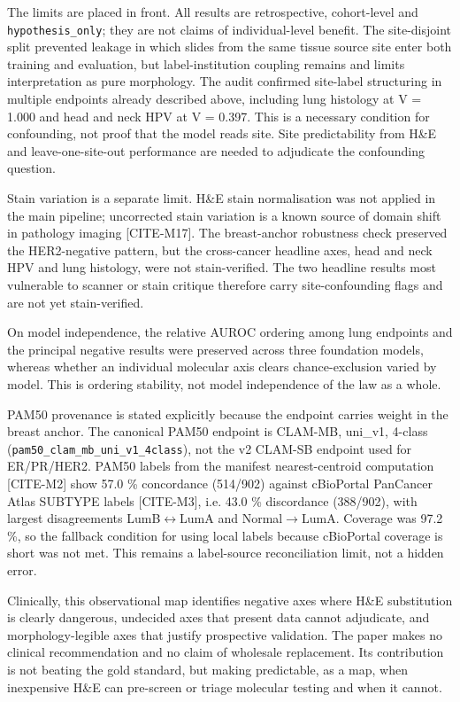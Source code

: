 The limits are placed in front. All results are retrospective, cohort-level and \texttt{hypothesis\_only}; they are not claims of individual-level benefit. The site-disjoint split prevented leakage in which slides from the same tissue source site enter both training and evaluation, but label-institution coupling remains and limits interpretation as pure morphology. The audit confirmed site-label structuring in multiple endpoints already described above, including lung histology at V = 1.000 and head and neck HPV at V = 0.397. This is a necessary condition for confounding, not proof that the model reads site. Site predictability from H\&E and leave-one-site-out performance are needed to adjudicate the confounding question.

Stain variation is a separate limit. H\&E stain normalisation was not applied in the main pipeline; uncorrected stain variation is a known source of domain shift in pathology imaging [CITE-M17]. The breast-anchor robustness check preserved the HER2-negative pattern, but the cross-cancer headline axes, head and neck HPV and lung histology, were not stain-verified. The two headline results most vulnerable to scanner or stain critique therefore carry site-confounding flags and are not yet stain-verified.

On model independence, the relative AUROC ordering among lung endpoints and the principal negative results were preserved across three foundation models, whereas whether an individual molecular axis clears chance-exclusion varied by model. This is ordering stability, not model independence of the law as a whole.

PAM50 provenance is stated explicitly because the endpoint carries weight in the breast anchor. The canonical PAM50 endpoint is CLAM-MB, uni\_v1, 4-class (\texttt{pam50\_clam\_mb\_uni\_v1\_4class}), not the v2 CLAM-SB endpoint used for ER/PR/HER2. PAM50 labels from the manifest nearest-centroid computation [CITE-M2] show 57.0 \% concordance (514/902) against cBioPortal PanCancer Atlas SUBTYPE labels [CITE-M3], i.e. 43.0 \% discordance (388/902), with largest disagreements LumB$\leftrightarrow$LumA and Normal$\rightarrow$LumA. Coverage was 97.2 \%, so the fallback condition for using local labels because cBioPortal coverage is short was not met. This remains a label-source reconciliation limit, not a hidden error.

Clinically, this observational map identifies negative axes where H\&E substitution is clearly dangerous, undecided axes that present data cannot adjudicate, and morphology-legible axes that justify prospective validation. The paper makes no clinical recommendation and no claim of wholesale replacement. Its contribution is not beating the gold standard, but making predictable, as a map, when inexpensive H\&E can pre-screen or triage molecular testing and when it cannot.

